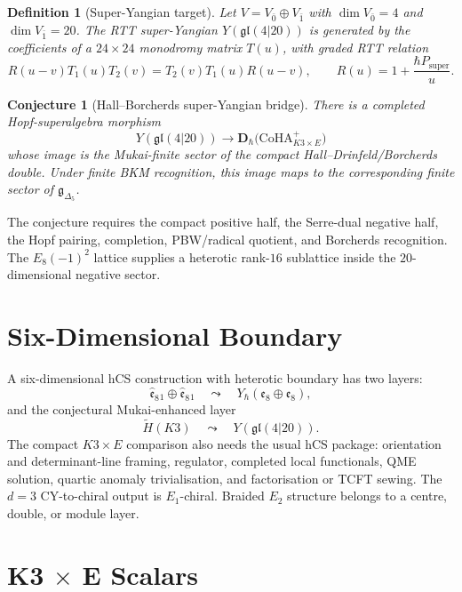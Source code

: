 \documentclass[11pt]{article}
\newtheorem{definition}[theorem]{Definition}
\newtheorem{conjecture}[theorem]{Conjecture}
\providecommand{\CoHA}{\mathrm{CoHA}}
\begin{document}
\begin{definition}[Super-Yangian target]
\label{def:super-yangian-target}
Let \(V=V_{\bar0}\oplus V_{\bar1}\) with
\(\dim V_{\bar0}=4\) and \(\dim V_{\bar1}=20\).  The RTT
super-Yangian \(Y(\mathfrak{gl}(4|20))\) is generated by the coefficients
of a \(24\times24\) monodromy matrix \(T(u)\), with graded RTT relation
\[
  R(u-v)T_1(u)T_2(v)=T_2(v)T_1(u)R(u-v),
  \qquad
  R(u)=1+\frac{\hbar P_{\mathrm{super}}}{u}.
\]
\end{definition}

\begin{conjecture}[Hall--Borcherds super-Yangian bridge]
\label{conj:super-yangian-bridge}
There is a completed Hopf-superalgebra morphism
\[
  Y(\mathfrak{gl}(4|20))
  \longrightarrow
  \mathbf D_\hbar\bigl(\CoHA^+_{K3\times E}\bigr)
\]
whose image is the Mukai-finite sector of the compact
Hall--Drinfeld/Borcherds double.  Under finite BKM recognition, this
image maps to the corresponding finite sector of
\(\mathfrak g_{\Delta_5}\).
\end{conjecture}

The conjecture requires the compact positive half, the Serre-dual
negative half, the Hopf pairing, completion, PBW/radical quotient, and
Borcherds recognition.  The \(E_8(-1)^2\) lattice supplies a heterotic
rank-\(16\) sublattice inside the \(20\)-dimensional negative sector.

\section{Six-Dimensional Boundary}
\label{sec:six-dimensional-boundary}

A six-dimensional hCS construction with heterotic boundary has two
layers:
\[
  \widehat{\mathfrak e}_8{}_1\oplus\widehat{\mathfrak e}_8{}_1
  \quad\leadsto\quad
  Y_\hbar(\mathfrak e_8\oplus\mathfrak e_8),
\]
and the conjectural Mukai-enhanced layer
\[
  \widetilde H(K3)\quad\leadsto\quad Y(\mathfrak{gl}(4|20)).
\]
The compact \(K3\times E\) comparison also needs the usual hCS package:
orientation and determinant-line framing, regulator, completed local
functionals, QME solution, quartic anomaly trivialisation, and
factorisation or TCFT sewing.  The \(d=3\) CY-to-chiral output is
\(E_1\)-chiral.  Braided \(E_2\) structure belongs to a centre, double,
or module layer.

\section{K3 \(\times\) E Scalars}
\label{sec:k3xe-scalars}
\end{document}
